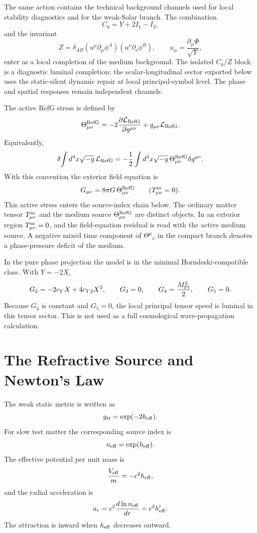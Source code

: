 \documentclass[12pt,a4paper]{article}
\begin{document}
The same action contains the technical background channels used for local stability diagnostics and for the weak-Solar branch. The combination
\[
C_6=Y+2I_1-I_3,
\]
and the invariant
\[
Z=\delta_{AB}(u^\mu\partial_\mu\phi^A)(u^\nu\partial_\nu\phi^B),
\qquad
u_\mu=\frac{\partial_\mu\Phi}{\sqrt{Y}},
\]
enter as a local completion of the medium background. The isolated $C_6/Z$
block is a diagnostic luminal completion; the scalar-longitudinal sector
exported below uses the static-silent dynamic repair at local principal-symbol
level.
The phase and spatial responses remain independent channels.

The active RefG stress is defined by
\[
\Theta^{\rm RefG}_{\mu\nu}
=-2\frac{\partial\mathcal L_{\rm RefG}}{\partial g^{\mu\nu}}
+g_{\mu\nu}\mathcal L_{\rm RefG}.
\]
Equivalently,
\[
\delta\!\int d^4x\sqrt{-g}\,\mathcal L_{\rm RefG}
=-\frac12\int d^4x\sqrt{-g}\,
\Theta^{\rm RefG}_{\mu\nu}\delta g^{\mu\nu}.
\]
With this convention the exterior field equation is
\[
G_{\mu\nu}=8\pi G\,\Theta^{\rm RefG}_{\mu\nu}
\qquad (T_{\mu\nu}^{\rm m}=0).
\]
This active stress enters the source-index chain below. The ordinary matter tensor $T_{\mu\nu}^{\rm m}$ and the medium source $\Theta_{\mu\nu}^{\rm RefG}$ are distinct objects. In an exterior region $T_{\mu\nu}^{\rm m}=0$, and the field-equation residual is read with the active medium source. A negative mixed time component of $\Theta^\mu{}_\nu$ in the compact branch denotes a phase-pressure deficit of the medium.

In the pure phase projection the model is in the minimal Horndeski-compatible class. With $Y=-2X$,
\[
G_2=-2c_YX+4c_{Y2}X^2,\qquad
G_3=0,\qquad
G_4=\frac{M_{\rm Pl}^2}{2},\qquad
G_5=0.
\]
Because $G_4$ is constant and $G_5=0$, the local principal tensor speed is
luminal in this tensor sector. This is not used as a full cosmological
wave-propagation calculation.

\section{The Refractive Source and Newton's Law}

The weak static metric is written as
\[
g_{tt}=\exp(-2h_{\rm eff}).
\]
For slow test matter the corresponding source index is
\[
n_{\rm eff}=\exp(h_{\rm eff}).
\]
The effective potential per unit mass is
\[
\frac{V_{\rm eff}}{m}=-c^2h_{\rm eff},
\]
and the radial acceleration is
\[
a_r=c^2\frac{d\ln n_{\rm eff}}{dr}
=c^2h_{\rm eff}'.
\]
The attraction is inward when $h_{\rm eff}$ decreases outward.
\end{document}
